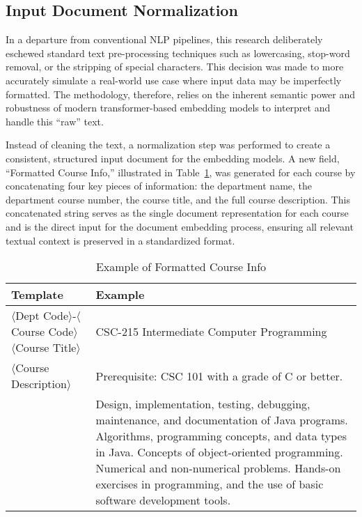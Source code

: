 \subsection{Input Document Normalization}\label{ch:3.2.2}
In a departure from conventional NLP pipelines, this research deliberately eschewed standard text pre-processing techniques such as lowercasing, stop-word removal, or the stripping of special characters. This decision was made to more accurately simulate a real-world use case where input data may be imperfectly formatted. The methodology, therefore, relies on the inherent semantic power and robustness of modern transformer-based embedding models to interpret and handle this ``raw'' text.

Instead of cleaning the text, a normalization step was performed to create a consistent, structured input document for the embedding models. A new field, ``Formatted Course Info,'' illustrated in Table~\ref{tbl:formattedcourse}, was generated for each course by concatenating four key pieces of information: the department name, the department course number, the course title, and the full course description. This concatenated string serves as the single document representation for each course and is the direct input for the document embedding process, ensuring all relevant textual context is preserved in a standardized format.

\begin{table}[tb]
    \captionsetup{skip=5pt}
    \centering
    \caption{Example of Formatted Course Info}
    \begin{tabular}{p{}p{}}
        \toprule
        \textbf{Template} & \textbf{Example} \\
        \midrule
        \small
        \(\langle\)Dept Code\(\rangle\)-\(\langle\)Course Code\(\rangle\) \(\langle\)Course Title\(\rangle\)     & 
    \small CSC-215  Intermediate Computer Programming \\
        
    \small \(\langle\)Course Description\(\rangle\) &  
    \small Prerequisite: CSC 101 with a grade of C or better. \\
        & 
    \small Design, implementation, testing, debugging, maintenance, and documentation of Java programs. Algorithms, programming concepts, and data types in Java. Concepts of object-oriented programming. Numerical and non-numerical problems. Hands-on exercises in programming, and the use of basic software development tools. \\
        \bottomrule
    \end{tabular}
    \label{tbl:formattedcourse}
\end{table}


